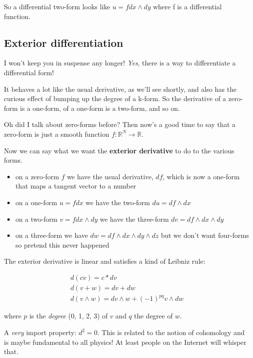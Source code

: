 \documentclass{article}
\theoremstyle{definition}
\begin{document}
So a differential two-form looks like $u = f dx \wedge dy$ where f is a
differential function.

\subsection {Exterior differentiation}

I won't keep you in suspense any longer! \textit{Yes}, there is a way to
differentiate a differential form!

It behaves a lot like the usual derivative, as we'll see shortly, and also has
the curious effect of bumping up the degree of a k-form. So the derivative of a
zero-form is a one-form, of a one-form is a two-form, and so on.

Oh did I talk about zero-forms before? Then now's a good time to say that a
zero-form is just a smooth function $f : \mathbb{R}^{N} \to \mathbb{R}$.

Now we can say what we want the \textbf{exterior derivative} to do to the
various forms.

\begin{itemize}
  \item on a zero-form $f$ we have the usual derivative, $df$, which is
    now a one-form that maps a tangent vector to a number
  \item on a one-form $u = f dx$ we have the two-form $du = df \wedge dx$
  \item on a two-form $v = f dx \wedge dy$ we have the three-form $dv = df \wedge dx \wedge
    dy$
  \item on a three-form we have $dw = df \wedge dx \wedge dy \wedge dz$ but
    we don't want four-forms so pretend this never happened
\end{itemize}

The exterior derivative is linear and satisfies a kind of Leibniz rule:

\begin{gather*}
  d(cv) = c * dv \\
  d(v + w) = dv + dw \\
  d(v \wedge w) = dv \wedge w + (-1)^{pq} v \wedge dw
\end{gather*}

where $p$ is the \textit{degree} (0, 1, 2, 3) of $v$ and $q$ the degree of $w$.

A \textit{very} import property: $d^{2} = 0$. This is related to the notion of
cohomology and is maybe fundamental to all physics! At least people on the
Internet will whisper that.
\end{document}
